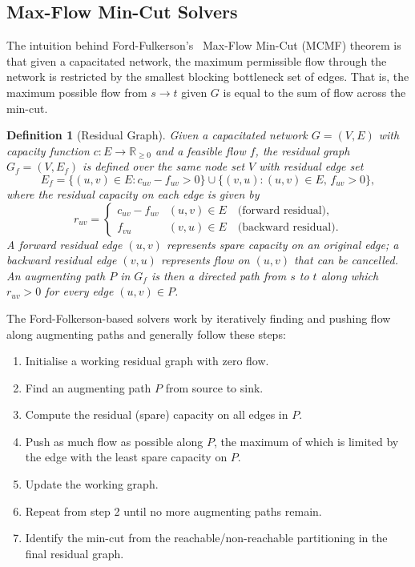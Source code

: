 \documentclass[12pt]{report}
\newtheorem{definition}{Definition}
\begin{document}
\subsection{Max-Flow Min-Cut Solvers}

The intuition behind Ford-Fulkerson's~\cite{ford1956,ford1962} Max-Flow Min-Cut (MCMF) theorem is that given a capacitated network, the maximum permissible flow through the network is restricted by the smallest blocking bottleneck set of edges. That is, the maximum possible flow from $s \to t$ given $G$ is equal to the sum of flow across the min-cut.


\begin{definition}[Residual Graph]
Given a capacitated network $G=(V,E)$ with capacity function 
$c:E\to\mathbb{R}_{\ge 0}$ and a feasible flow $f$, the residual 
graph $G_f=(V,E_f)$ is defined over the same node set $V$ with 
residual edge set
\[
E_f = \{(u,v)\in E : c_{uv} - f_{uv} > 0\} 
      \cup \{(v,u) : (u,v)\in E,\, f_{uv} > 0\},
\]
where the residual capacity on each edge is given by
\[
r_{uv} = \begin{cases} c_{uv} - f_{uv} & (u,v)\in E 
\quad \text{(forward residual)},\\ 
f_{vu} & (v,u)\in E \quad \text{(backward residual).}\end{cases}
\]
A forward residual edge $(u,v)$ represents spare capacity on an original edge; a backward residual edge $(v,u)$ represents flow on $(u,v)$ that can be cancelled.
An augmenting path $P$ in $G_f$ is then a directed path from 
$s$ to $t$ along which $r_{uv}>0$ for every edge $(u,v)\in P$.
\end{definition}

The Ford-Folkerson-based solvers work by iteratively finding and pushing flow along augmenting paths and generally follow these steps:

\begin{enumerate}
\item Initialise a working residual graph with zero flow.
\item Find an augmenting path $P$ from source to sink.
\item Compute the residual (spare) capacity on all edges in $P$.
\item Push as much flow as possible along $P$, the maximum of
which is limited by the edge with the least spare capacity on $P$.
\item Update the working graph.
\item Repeat from step 2 until no more augmenting paths remain.
\item Identify the min-cut from the reachable/non-reachable 
partitioning in the final residual graph.
\end{enumerate}
\end{document}
